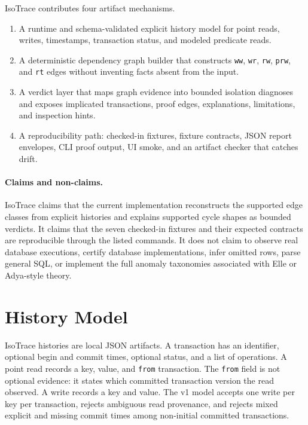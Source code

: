 \documentclass[10pt]{article}
\newcommand{\code}[1]{\texttt{#1}}
\begin{document}
IsoTrace contributes four artifact mechanisms.

\begin{enumerate}
\item A runtime and schema-validated explicit history model for point reads, writes, timestamps, transaction status, and modeled predicate reads.
\item A deterministic dependency graph builder that constructs \code{ww}, \code{wr}, \code{rw}, \code{prw}, and \code{rt} edges without inventing facts absent from the input.
\item A verdict layer that maps graph evidence into bounded isolation diagnoses and exposes implicated transactions, proof edges, explanations, limitations, and inspection hints.
\item A reproducibility path: checked-in fixtures, fixture contracts, JSON report envelopes, CLI proof output, UI smoke, and an artifact checker that catches drift.
\end{enumerate}

\paragraph{Claims and non-claims.}
IsoTrace claims that the current implementation reconstructs the supported edge classes from explicit histories and explains supported cycle shapes as bounded verdicts. It claims that the seven checked-in fixtures and their expected contracts are reproducible through the listed commands. It does not claim to observe real database executions, certify database implementations, infer omitted rows, parse general SQL, or implement the full anomaly taxonomies associated with Elle or Adya-style theory.

\section{History Model}

IsoTrace histories are local JSON artifacts. A transaction has an identifier, optional begin and commit times, optional status, and a list of operations. A point read records a key, value, and \code{from} transaction. The \code{from} field is not optional evidence: it states which committed transaction version the read observed. A write records a key and value. The v1 model accepts one write per key per transaction, rejects ambiguous read provenance, and rejects mixed explicit and missing commit times among non-initial committed transactions.
\end{document}
